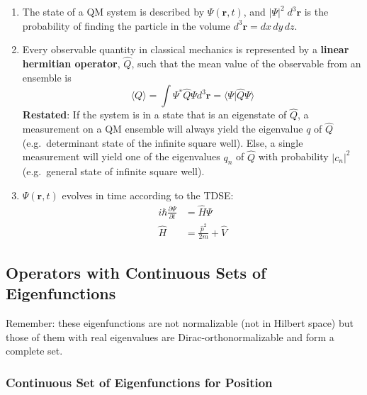 \begin{enumerate}
    \item The state of a QM system is described by $\Psi(\mathbf{r},t)$, and $|\Psi|^2\; d^3 \mathbf{r}$ is the probability of finding the particle in the volume $d^3 \mathbf{r} = dx\,dy\,dz$.
    \item Every observable quantity in classical mechanics is represented by a \textbf{linear hermitian operator}, $\hat{Q}$, such that the mean value of the observable from an ensemble is
          \noindent\begin{equation*}
              \langle Q\rangle=\int\Psi^{*}\hat{Q}\Psi d^{3} \mathbf{r}= \langle\Psi|\hat{Q}\Psi\rangle
          \end{equation*}\newline
          \textbf{Restated}:\newline
          If the system is in a state that is an eigenstate of $\hat{Q}$, a measurement on a QM ensemble will always yield the eigenvalue $q$ of $\hat{Q}$ (e.g.\ determinant state of the infinite square well).\newline
          Else, a single measurement will yield one of the eigenvalues $q_n$ of $\hat{Q}$ with probability $|c_n|^2$ (e.g.\ general state of infinite square well).
    \item $\Psi(\mathbf{r},t)$ evolves in time according to the TDSE:
          \noindent\begin{align*}
              i\hbar \frac{\partial \Psi}{\partial t} & =\hat{H}\Psi                     \\
              \hat{H}                                 & = \frac{\hat{p}^2}{2m} + \hat{V}
          \end{align*}
\end{enumerate}

\subsection{Operators with Continuous Sets of Eigenfunctions}
Remember: these eigenfunctions are not normalizable (not in Hilbert space) but those of them with real eigenvalues are Dirac-orthonormalizable and form a complete set.

\subsubsection{Continuous Set of Eigenfunctions for Position}


